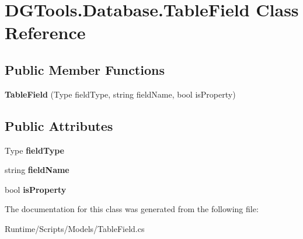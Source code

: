 \hypertarget{class_d_g_tools_1_1_database_1_1_table_field}{}\section{D\+G\+Tools.\+Database.\+Table\+Field Class Reference}
\label{class_d_g_tools_1_1_database_1_1_table_field}
\subsection*{Public Member Functions}
\begin{DoxyCompactItemize}
\item 
\mbox{\label{class_d_g_tools_1_1_database_1_1_table_field_a3a59b8951ae36bb98b259253a31edd44}} 
{\bfseries Table\+Field} (Type field\+Type, string field\+Name, bool is\+Property)
\end{DoxyCompactItemize}
\subsection*{Public Attributes}
\begin{DoxyCompactItemize}
\item 
\mbox{\label{class_d_g_tools_1_1_database_1_1_table_field_a0c66e90ce6b33d2dfc803671a8c92a56}} 
Type {\bfseries field\+Type}
\item 
\mbox{\label{class_d_g_tools_1_1_database_1_1_table_field_abc6b672844e30cb8b0535943dad5169f}} 
string {\bfseries field\+Name}
\item 
\mbox{\label{class_d_g_tools_1_1_database_1_1_table_field_a8a249d4c47802e8fc10f497d6c097a69}} 
bool {\bfseries is\+Property}
\end{DoxyCompactItemize}


The documentation for this class was generated from the following file\+:\begin{DoxyCompactItemize}
\item 
Runtime/\+Scripts/\+Models/Table\+Field.\+cs\end{DoxyCompactItemize}
